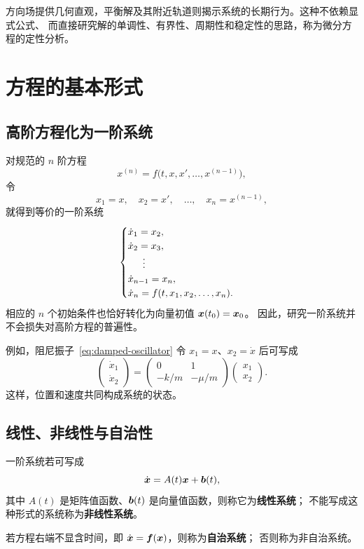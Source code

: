 方向场提供几何直观，平衡解及其附近轨道则揭示系统的长期行为。这种不依赖显式公式、
而直接研究解的单调性、有界性、周期性和稳定性的思路，称为微分方程的定性分析。

\section{方程的基本形式}

\subsection*{高阶方程化为一阶系统}

对规范的 $n$ 阶方程
\[
	x^{(n)}=f\bigl(t,x,x',\ldots,x^{(n-1)}\bigr),
\]
令
\[
	x_1=x,\quad x_2=x',\quad\ldots,\quad x_n=x^{(n-1)},
\]
就得到等价的一阶系统
\[
	\begin{cases}
		\dot{x}_1=x_2,\\
		\dot{x}_2=x_3,\\
		\hspace{1.5em}\vdots\\
		\dot{x}_{n-1}=x_n,\\
		\dot{x}_n=f(t,x_1,x_2,\ldots,x_n).
	\end{cases}
\]
相应的 $n$ 个初始条件也恰好转化为向量初值 $\boldsymbol{x}(t_0)=\boldsymbol{x}_0$。
因此，研究一阶系统并不会损失对高阶方程的普遍性。

例如，阻尼振子~\eqref{eq:damped-oscillator} 令 $x_1=x$、$x_2=\dot x$ 后可写成
\[
	\begin{pmatrix}\dot x_1\\ \dot x_2\end{pmatrix}
	=
	\begin{pmatrix}
		0 & 1\\
		-k/m & -\mu/m
	\end{pmatrix}
	\begin{pmatrix}x_1\\x_2\end{pmatrix}.
\]
这样，位置和速度共同构成系统的状态。

\subsection*{线性、非线性与自治性}

\begin{definition}
一阶系统若可写成
\[
	\dot{\boldsymbol{x}}=A(t)\boldsymbol{x}+\boldsymbol{b}(t),
\]
其中 $A(t)$ 是矩阵值函数、$\boldsymbol{b}(t)$ 是向量值函数，则称它为\textbf{线性系统}；
不能写成这种形式的系统称为\textbf{非线性系统}。

若方程右端不显含时间，即 $\dot{\boldsymbol{x}}=\boldsymbol{f}(\boldsymbol{x})$，则称为\textbf{自治系统}；
否则称为非自治系统。
\end{definition}

